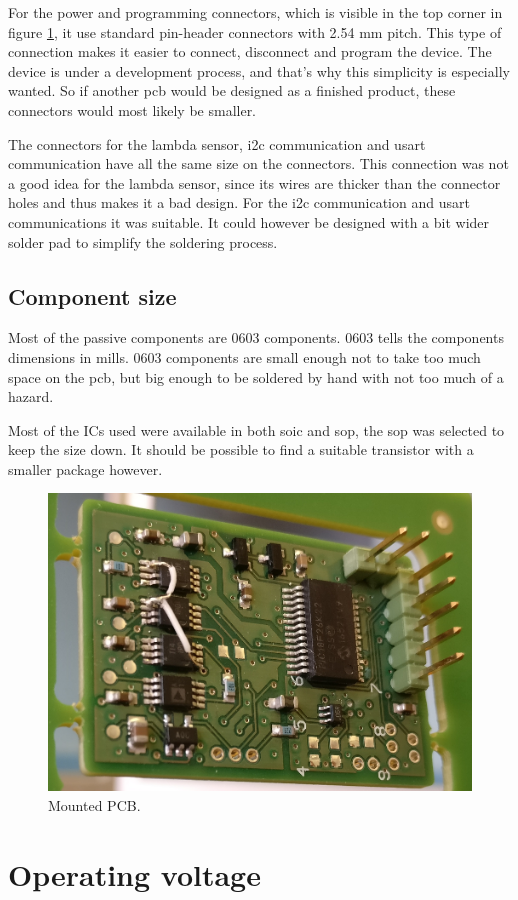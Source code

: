 For the power and programming connectors, which is visible in the top corner in figure \ref{fig:monterad_PCB}, it use standard pin-header connectors with 2.54 mm pitch. This type of connection makes it easier to connect, disconnect and program the device. The device is under a development process, and that's why this simplicity is especially wanted. So if another \ac{pcb} would be designed as a finished product, these connectors would most likely be smaller.


The connectors for the lambda sensor, \ac{i2c} communication and \ac{usart} communication have all the same size on the connectors. This connection was not a good idea for the lambda sensor, since its wires are thicker than the connector holes and thus makes it a bad design. For the \ac{i2c} communication and \ac{usart} communications it was suitable. It could however be designed with a bit wider solder pad to simplify the soldering process.


\subsection{Component size}

Most of the passive components are 0603 components. 0603 tells the components dimensions in mills. 0603 components are small enough not to take too much space on the \ac{pcb}, but big enough to be soldered by hand with not too much of a hazard.

Most of the ICs used were available in both \ac{soic} and \ac{sop}, the \ac{sop} was selected to keep the size down. It should be possible to find a suitable transistor with a smaller package however.


\begin{figure}
    \centering
    \includegraphics[width=.6\textwidth]{Figures/PCB_monterad.png}
    \caption{Mounted PCB.}
    \label{fig:monterad_PCB}
\end{figure}


\section{Operating voltage}

